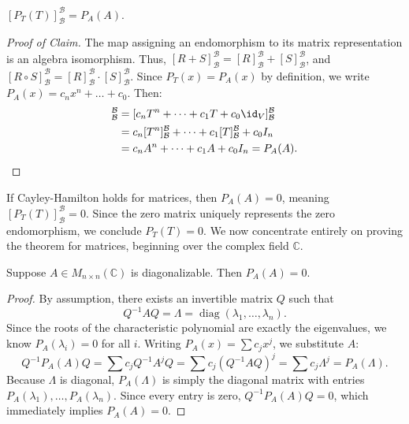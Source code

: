 \begin{claim*}\label{claim:matrix_poly}
  $[P_T(T)]_{\mathcal{B}}^{\mathcal{B}} = P_A(A)$.
\end{claim*}

\begin{proof}[Proof of Claim]
  The map assigning an endomorphism to its matrix representation is an algebra isomorphism. Thus, $[R+S]_{\mathcal{B}}^{\mathcal{B}} = [R]_{\mathcal{B}}^{\mathcal{B}} + [S]_{\mathcal{B}}^{\mathcal{B}}$, and $[R \circ S]_{\mathcal{B}}^{\mathcal{B}} = [R]_{\mathcal{B}}^{\mathcal{B}} \cdot [S]_{\mathcal{B}}^{\mathcal{B}}$.
  Since $P_T(x) = P_A(x)$ by definition, we write $P_A(x) = c_n x^n + \dots + c_0$. Then:
  \begin{align*}
    [P_T(T)]_{\mathcal{B}}^{\mathcal{B}} &= [c_n T^n + \dots + c_1 T + c_0 \id_V]_{\mathcal{B}}^{\mathcal{B}} \\
    &= c_n [T^n]_{\mathcal{B}}^{\mathcal{B}} + \dots + c_1 [T]_{\mathcal{B}}^{\mathcal{B}} + c_0 I_n \\
    &= c_n A^n + \dots + c_1 A + c_0 I_n = P_A(A).
  \end{align*}
\end{proof}

If Cayley-Hamilton holds for matrices, then $P_A(A) = 0$, meaning $[P_T(T)]_{\mathcal{B}}^{\mathcal{B}} = 0$. Since the zero matrix uniquely represents the zero endomorphism, we conclude $P_T(T) = 0$. We now concentrate entirely on proving the theorem for matrices, beginning over the complex field $\mathbb{C}$.

\begin{lemma}\label{lemma:cayley_diagonalizable}
  Suppose $A \in M_{n \times n}(\mathbb{C})$ is diagonalizable. Then $P_A(A) = 0$.
\end{lemma}

\begin{proof}
  By assumption, there exists an invertible matrix $Q$ such that 
  \[Q^{-1} A Q = \Lambda = \operatorname{diag}(\lambda_1, \dots, \lambda_n). \] 
  Since the roots of the characteristic polynomial are exactly the eigenvalues, we know $P_A(\lambda_i) = 0$ for all $i$. Writing $P_A(x) = \sum c_j x^j$, we substitute $A$:
  \[
  Q^{-1} P_A(A) Q = \sum c_j Q^{-1} A^j Q = \sum c_j (Q^{-1} A Q)^j = \sum c_j \Lambda^j = P_A(\Lambda).
  \]
  Because $\Lambda$ is diagonal, $P_A(\Lambda)$ is simply the diagonal matrix with entries $P_A(\lambda_1), \dots, P_A(\lambda_n)$. Since every entry is zero, $Q^{-1} P_A(A) Q = 0$, which immediately implies $P_A(A) = 0$.
\end{proof}

